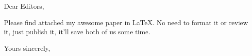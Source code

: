 \documentclass[11pt]{letter}
\begin{document}
\begin{letter}{}
\opening{Dear Editors,}

Please find attached my awesome paper in \LaTeX.
No need to format it or review it, just publish it, it'll save both of us some time.

\closing{Yours sincerely,}


\end{letter}
\end{document}
